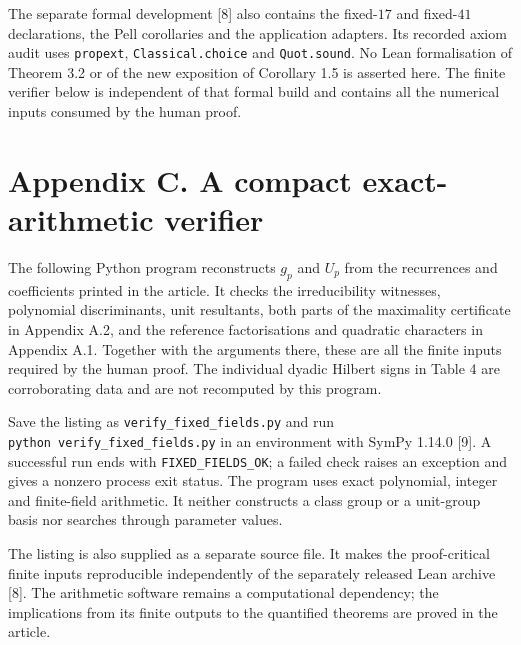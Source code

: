 \documentclass[11pt,a4paper]{article}
\begin{document}
The separate formal development {[}8{]} also contains the fixed-\(17\)
and fixed-\(41\) declarations, the Pell corollaries and the application
adapters. Its recorded axiom audit uses \texttt{propext},
\texttt{Classical.choice} and \texttt{Quot.sound}. No Lean formalisation
of Theorem 3.2 or of the new exposition of Corollary 1.5 is asserted
here. The finite verifier below is independent of that formal build and
contains all the numerical inputs consumed by the human proof.

\section{Appendix C. A compact exact-arithmetic
verifier}\label{standalone-verifier}

The following Python program reconstructs \(g_p\) and \(U_p\) from the
recurrences and coefficients printed in the article. It checks the
irreducibility witnesses, polynomial discriminants, unit resultants,
both parts of the maximality certificate in Appendix A.2, and the
reference factorisations and quadratic characters in Appendix A.1.
Together with the arguments there, these are all the finite inputs
required by the human proof. The individual dyadic Hilbert signs in
Table 4 are corroborating data and are not recomputed by this program.

Save the listing as \texttt{verify\_fixed\_fields.py} and run
\texttt{python\ verify\_fixed\_fields.py} in an environment with SymPy
1.14.0 {[}9{]}. A successful run ends with \texttt{FIXED\_FIELDS\_OK}; a
failed check raises an exception and gives a nonzero process exit
status. The program uses exact polynomial, integer and finite-field
arithmetic. It neither constructs a class group or a unit-group basis
nor searches through parameter values.

The listing is also supplied as a separate source file. It makes the
proof-critical finite inputs reproducible independently of the
separately released Lean archive {[}8{]}. The arithmetic software
remains a computational dependency; the implications from its finite
outputs to the quantified theorems are proved in the article.
\end{document}
